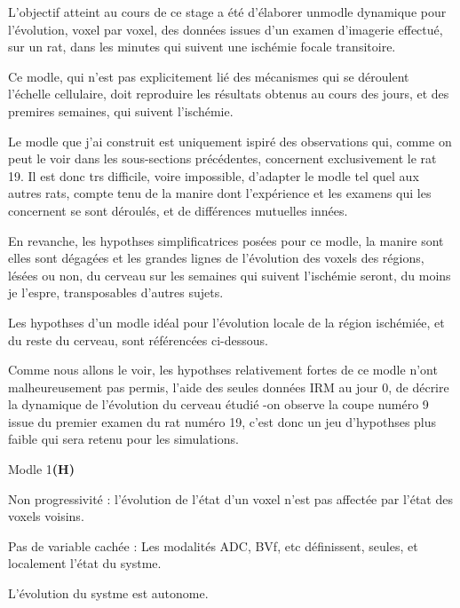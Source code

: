 L'objectif atteint au cours de ce stage a \'et\'e d'\'elaborer unmodle dynamique pour l'\'evolution, voxel par voxel, %
des donn\'ees issues d'un examen d'imagerie effectu\'e, sur un rat, dans les minutes qui suivent une isch\'emie focale transitoire.

\par
Ce modle, qui n'est pas explicitement li\'e  des m\'ecanismes qui se d\'eroulent  l'\'echelle cellulaire, %
doit reproduire les r\'esultats obtenus au cours des jours, et des premires semaines, qui suivent l'isch\'emie.

\par
Le modle que j'ai construit est uniquement ispir\'e des observations qui, comme on peut le voir dans les sous-sections pr\'ec\'edentes, %
concernent exclusivement le rat 19. %
Il est donc trs difficile, voire impossible, d'adapter le modle tel quel aux autres rats, %
compte tenu de la manire dont l'exp\'erience et les examens qui les concernent se sont d\'eroul\'es, %
et de diff\'erences mutuelles inn\'ees.

\par
En revanche, les hypothses simplificatrices pos\'ees pour ce modle, la manire sont elles sont d\'egag\'ees %
et les grandes lignes de l'\'evolution des voxels des r\'egions, l\'es\'ees ou non, du cerveau sur les semaines qui suivent l'isch\'emie seront, %
du moins je l'espre, transposables  d'autres sujets.

\etoile

Les hypothses d'un modle \og{} id\'eal\fg{} pour l'\'evolution locale de la r\'egion isch\'emi\'ee, et du reste du cerveau, %
sont r\'ef\'erenc\'ees ci-dessous.

\par
Comme nous allons le voir, les hypothses relativement fortes de ce modle n'ont malheureusement pas permis,  l'aide des seules donn\'ees IRM au jour 0, %
de d\'ecrire la dynamique de l'\'evolution du cerveau \'etudi\'e -on observe la coupe num\'ero 9 issue du premier examen du rat num\'ero 19, %
c'est donc un jeu d'hypothses plus faible qui sera retenu pour les simulations.


\begin{modmerate}{Modle 1}{\textbf{(H\arabic*)}}
\item\label{nprog} Non progressivit\'e : l'\'evolution de l'\'etat d'un voxel n'est pas affect\'ee par l'\'etat des voxels voisins.
\item\label{var_comp} Pas de variable cach\'ee : Les modalit\'es ADC, BVf, etc d\'efinissent, seules, et localement l'\'etat du systme.
\item\label{auto} L'\'evolution du systme est autonome.
\end{modmerate}

